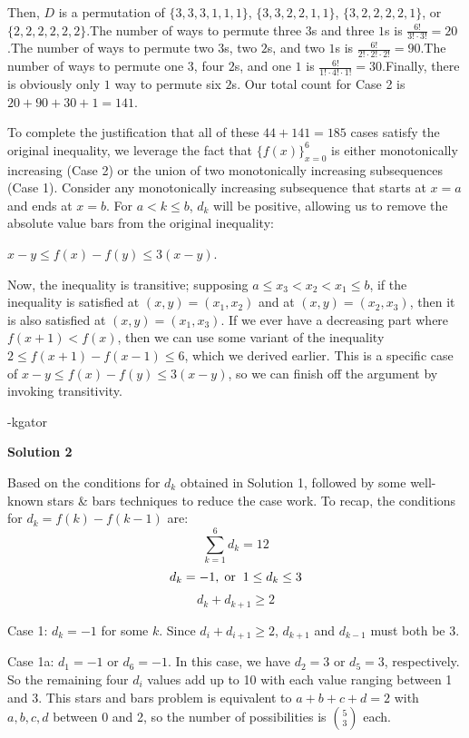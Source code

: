 \begin{enumerate}
 Then, $D$ is a permutation of $\{3, 3, 3, 1, 1, 1\}$, $\{3, 3, 2, 2, 1, 1\}$, $\{3, 2, 2, 2, 2, 1\}$, or $\{2, 2, 2, 2, 2, 2\}$.The number of ways to permute three $3$s and three $1$s is $\frac{6!}{3! \cdot 3!} = 20$.The number of ways to permute two $3$s, two $2$s, and two $1$s is $\frac{6!}{2! \cdot 2! \cdot 2!} = 90$.The number of ways to permute one $3$, four $2$s, and one $1$ is $\frac{6!}{1! \cdot 4! \cdot 1!} = 30$.Finally, there is obviously only $1$ way to permute six $2$s. Our total count for Case 2 is $20 + 90 + 30 + 1 = 141$.

 To complete the justification that all of these $44 + 141 = \boxed{185}$ cases satisfy the original inequality, we leverage the fact that $\{f(x)\}_{x=0}^{6}$ is either monotonically increasing (Case 2) or the union of two monotonically increasing subsequences (Case 1). Consider any monotonically increasing subsequence that starts at $x = a$ and ends at $x = b$. For $a < k \leq b$, $d_k$ will be positive, allowing us to remove the absolute value bars from the original inequality:

 $x - y \leq f(x) - f(y) \leq 3(x - y).$

 Now, the inequality is transitive; supposing $a \leq x_3 < x_2 < x_1 \leq b$, if the inequality is satisfied at $(x, y) = \left(x_1, x_2\right)$ and at $(x, y) = \left(x_2, x_3\right)$, then it is also satisfied at $(x, y) = \left(x_1, x_3\right)$. If we ever have a decreasing part where $f(x + 1) < f(x)$, then we can use some variant of the inequality $2 \leq f(x + 1) - f(x - 1) \leq 6$, which we derived earlier. This is a specific case of $x - y \leq f(x) - f(y) \leq 3(x - y)$, so we can finish off the argument by invoking transitivity.    

 -kgator

 



\textbf{Solution 2}

Based on the conditions for $d_k$ obtained in Solution 1, followed by some well-known stars & bars techniques to reduce the case work. To recap, the conditions for $d_k = f(k) - f(k-1)$ are:
 \[\sum_{k=1}^6 d_k = 12\]
 \[d_k = -1, \hspace{0.1cm} \mbox{or} \hspace{0.2cm}  1 \leq d_k \leq 3\]
 \[d_k + d_{k+1} \geq 2\]

 Case 1: $d_k = -1$ for some $k$. Since $d_i + d_{i+1} \geq 2$, $d_{k+1}$ and $d_{k-1}$ must both be 3. 

 Case 1a: $d_1 = -1$ or $d_6 = -1$. In this case, we have $d_2=3$ or $d_5=3$, respectively. So the remaining four $d_i$ values add up to 10 with each value ranging between 1 and 3. This stars and bars problem is equivalent to $a+b+c+d =2$ with $a,b,c,d$ between 0 and 2, so the number of possibilities is ${5 \choose 3}$ each.


\end{enumerate}

